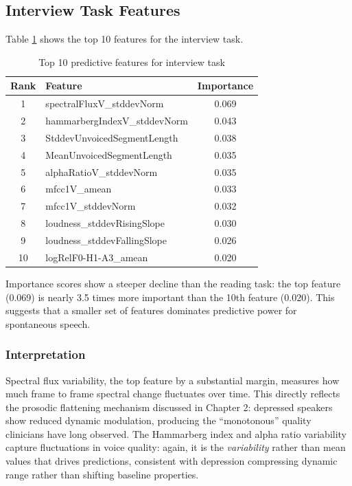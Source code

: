 \subsection{Interview Task Features}

Table \ref{tab:interview-features} shows the top 10 features for the interview task.

\begin{table}[h]
\centering
\caption{Top 10 predictive features for interview task}
\label{tab:interview-features}
\begin{tabular}{clc}
\hline
\textbf{Rank} & \textbf{Feature} & \textbf{Importance} \\
\hline
1 & spectralFluxV\_stddevNorm & 0.069 \\
2 & hammarbergIndexV\_stddevNorm & 0.043 \\
3 & StddevUnvoicedSegmentLength & 0.038 \\
4 & MeanUnvoicedSegmentLength & 0.035 \\
5 & alphaRatioV\_stddevNorm & 0.035 \\
6 & mfcc1V\_amean & 0.033 \\
7 & mfcc1V\_stddevNorm & 0.032 \\
8 & loudness\_stddevRisingSlope & 0.030 \\
9 & loudness\_stddevFallingSlope & 0.026 \\
10 & logRelF0-H1-A3\_amean & 0.020 \\
\hline
\end{tabular}
\end{table}

Importance scores show a steeper decline than the reading task: the top feature (0.069) is nearly 3.5 times more important than the 10th feature (0.020). This suggests that a smaller set of features dominates predictive power for spontaneous speech.

\subsubsection{Interpretation}

Spectral flux variability, the top feature by a substantial margin, measures how much frame to frame spectral change fluctuates over time. This directly reflects the prosodic flattening mechanism discussed in Chapter 2: depressed speakers show reduced dynamic modulation, producing the ``monotonous'' quality clinicians have long observed. The Hammarberg index and alpha ratio variability capture fluctuations in voice quality: again, it is the \textit{variability} rather than mean values that drives predictions, consistent with depression compressing dynamic range rather than shifting baseline properties.

